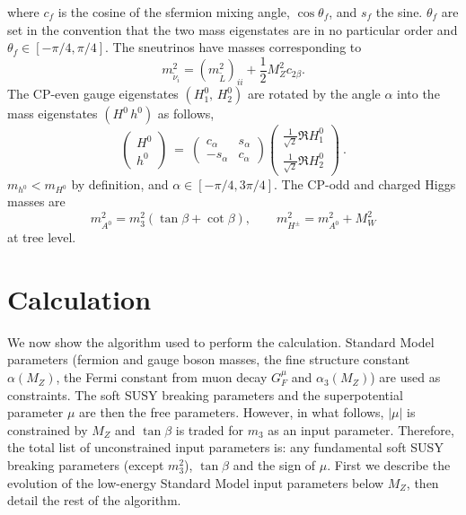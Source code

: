 \documentclass[]{article}
\def\half{\frac{1}{2}}
\begin{document}
%
where $c_f$ is the cosine of the sfermion mixing angle,
$\cos\theta_f$, and $s_f$ the sine. 
$\theta_f$ are set in the convention that the two mass eigenstates are in no
particular order and $\theta_f \in [-\pi/4, \pi/4]$. The sneutrinos have
masses corresponding to
\begin{equation}
m_{\tilde \nu_i}^2 = (m_{\tilde L}^2)_{ii} + \half M_Z^2 c_{2\beta}.
\end{equation}
The CP-even gauge eigenstates $(H_1^0,\, H_2^0)$ are rotated by the angle
$\alpha$ into the mass eigenstates $(H^0\, h^0)$ as follows,
%
\begin{equation}
\left(\begin{array}{c}H^0\\h^0\end{array}\right) \ =
\ \left(\begin{array}{cc} c_\alpha & s_\alpha\\-s_\alpha & c_\alpha
\end{array}\right)\left(\begin{array}{c} \frac{1}{\sqrt{2}} \Re  H_1^0
  \\\frac{1}{\sqrt{2}} \Re H_2^0\end{array}\right)~.
\label{rotateh}
\end{equation}
$m_{h^0} < m_{H^0}$ by
definition, and $\alpha \in [-\pi/4, 3 \pi/4]$.
The CP-odd and charged Higgs masses are
\begin{equation}
m_{A^0}^2 = m_3^2 (\tan \beta + \cot \beta),\qquad
m_{H^\pm}^2 = m_{A^0}^2 + M_W^2
\end{equation}
at tree level. 

\section{Calculation \label{sec:calculation}}

We now show the algorithm used to perform the calculation.
Standard Model parameters (fermion and gauge boson masses,
the fine structure constant $\alpha (M_Z)$, the Fermi constant from muon decay
$G_F^\mu$ and $\alpha_3(M_Z)$) are used as constraints. 
The soft SUSY breaking parameters and the superpotential parameter $\mu$ 
are then the free parameters. However, in what follows, $|\mu|$ is constrained
by $M_Z$ and $\tan \beta$ is traded for $m_3$ as an input parameter.
Therefore, the total list of unconstrained input parameters is: any
fundamental soft 
SUSY breaking parameters (except $m_3^2$), $\tan \beta$ and the sign
of $\mu$. 
First we describe the evolution of the low-energy Standard Model input
parameters below $M_Z$, then detail the rest of the algorithm.
\end{document}

